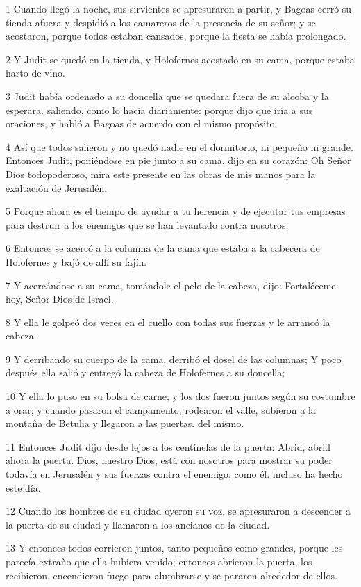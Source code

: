 \par 1 Cuando llegó la noche, sus sirvientes se apresuraron a partir, y Bagoas cerró su tienda afuera y despidió a los camareros de la presencia de su señor; y se acostaron, porque todos estaban cansados, porque la fiesta se había prolongado.
\par 2 Y Judit se quedó en la tienda, y Holofernes acostado en su cama, porque estaba harto de vino.
\par 3 Judit había ordenado a su doncella que se quedara fuera de su alcoba y la esperara. saliendo, como lo hacía diariamente: porque dijo que iría a sus oraciones, y habló a Bagoas de acuerdo con el mismo propósito.
\par 4 Así que todos salieron y no quedó nadie en el dormitorio, ni pequeño ni grande. Entonces Judit, poniéndose en pie junto a su cama, dijo en su corazón: Oh Señor Dios todopoderoso, mira este presente en las obras de mis manos para la exaltación de Jerusalén.
\par 5 Porque ahora es el tiempo de ayudar a tu herencia y de ejecutar tus empresas para destruir a los enemigos que se han levantado contra nosotros.
\par 6 Entonces se acercó a la columna de la cama que estaba a la cabecera de Holofernes y bajó de allí su fajín.
\par 7 Y acercándose a su cama, tomándole el pelo de la cabeza, dijo: Fortaléceme hoy, Señor Dios de Israel.
\par 8 Y ella le golpeó dos veces en el cuello con todas sus fuerzas y le arrancó la cabeza.
\par 9 Y derribando su cuerpo de la cama, derribó el dosel de las columnas; Y poco después ella salió y entregó la cabeza de Holofernes a su doncella;
\par 10 Y ella lo puso en su bolsa de carne; y los dos fueron juntos según su costumbre a orar; y cuando pasaron el campamento, rodearon el valle, subieron a la montaña de Betulia y llegaron a las puertas. del mismo.
\par 11 Entonces Judit dijo desde lejos a los centinelas de la puerta: Abrid, abrid ahora la puerta. Dios, nuestro Dios, está con nosotros para mostrar su poder todavía en Jerusalén y sus fuerzas contra el enemigo, como él. incluso ha hecho este día.
\par 12 Cuando los hombres de su ciudad oyeron su voz, se apresuraron a descender a la puerta de su ciudad y llamaron a los ancianos de la ciudad.
\par 13 Y entonces todos corrieron juntos, tanto pequeños como grandes, porque les parecía extraño que ella hubiera venido; entonces abrieron la puerta, los recibieron, encendieron fuego para alumbrarse y se pararon alrededor de ellos.
